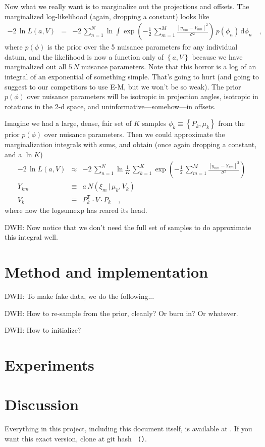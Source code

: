 \documentclass[12pt]{article}
\newcommand{\normal}{N}
\newcommand{\transpose}{^{\mathsf{T}}}
\newcommand{\given}{\,|\,}
\newcommand{\like}{L}
\newcommand{\setof}[1]{\left\{{#1}\right\}}
\newcommand{\dd}{\mathrm{d}}
\begin{document}
Now what we really want is to marginalize out the projections and
offsets.
The marginalized log-likelihood (again, dropping a constant) looks like
\begin{eqnarray}
  -2\,\ln\like(a,V) &=& -2\,\sum_{n=1}^N\ln\int\exp(-\frac{1}{2}\,\sum_{m=1}^M \frac{[y_{nm} - Y_{nm}]^2}{\sigma^2})\,p(\phi_n)\,\dd\phi_n
  \quad,
\end{eqnarray}
where $p(\phi)$ is the prior over the 5 nuisance parameters for any
individual datum, and the likelihood is now a function only of
$\setof{a,V}$ because we have marginalized out all $5\,N$ nuisance
parameters.
Note that this horror is a log of an integral of an exponential of
something simple.
That's going to hurt (and going to suggest to our competitors to use
E-M, but we won't be so weak).
The prior $p(\phi)$ over nuisance parameters will be isotropic in
projection angles, isotropic in rotations in the 2-d space, and
uninformative---somehow---in offsets.

Imagine we had a large, dense, fair set of $K$ samples
$\phi_k\equiv\setof{P_k, \mu_k}$ from the prior $p(\phi)$ over
nuisance parameters.
Then we could approximate the marginalization integrals with sums, and
obtain (once again dropping a constant, and a $\ln K$)
\begin{eqnarray}
  -2\,\ln\like(a,V) &\approx& -2\,\sum_{n=1}^N\ln\frac{1}{K}\,\sum_{k=1}^K\exp(-\frac{1}{2}\,\sum_{m=1}^M \frac{[y_{nm} - Y_{km}]^2}{\sigma^2})
  \\
  Y_{km} &\equiv& a\,\normal(\xi_m\given\mu_k,V_k)
  \\
  V_k &\equiv& P_k\transpose\cdot V\cdot P_k
  \quad,
\end{eqnarray}
where now the logsumexp has reared its head.

DWH: Now notice that we don't need the full set of samples to do
approximate this integral well.

\section{Method and implementation}

DWH: To make fake data, we do the following...

DWH: How to re-sample from the prior, cleanly?  Or burn in?  Or whatever.

DWH: How to initialize?

\section{Experiments}

\section{Discussion}


\bigskip

Everything in this project, including this document itself, is
available at \giturl.  If you want this exact version, clone at git
hash \texttt{\githash~(\gitdate)}.
\end{document}
